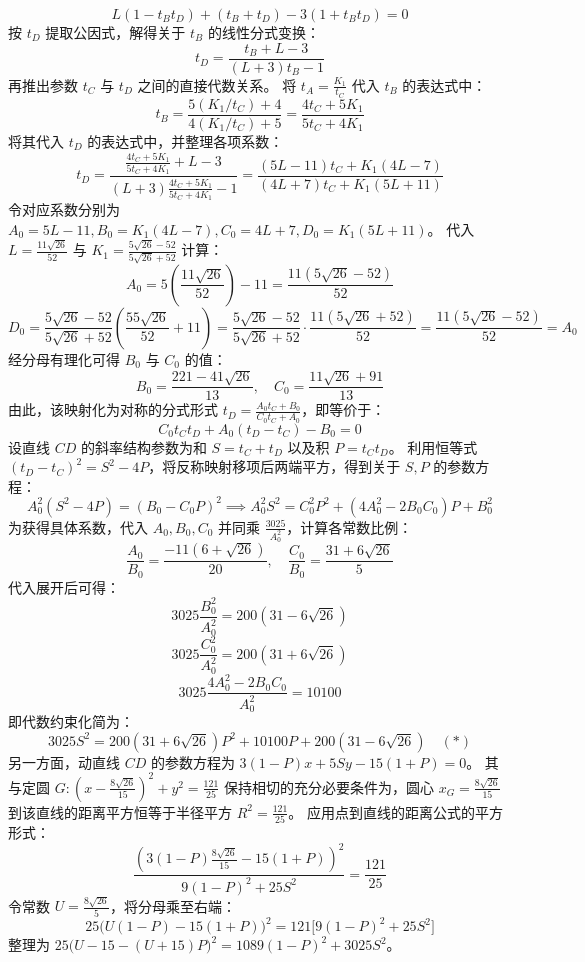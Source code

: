 \begin{solution}
$$ L(1 - t_B t_D) + (t_B + t_D) - 3(1 + t_B t_D) = 0 $$
按 $t_D$ 提取公因式，解得关于 $t_B$ 的线性分式变换：
$$ t_D = \frac{t_B + L - 3}{(L + 3)t_B - 1} $$
再推出参数 $t_C$ 与 $t_D$ 之间的直接代数关系。
将 $t_A = \frac{K_1}{t_C}$ 代入 $t_B$ 的表达式中：
$$ t_B = \frac{5(K_1/t_C) + 4}{4(K_1/t_C) + 5} = \frac{4t_C + 5K_1}{5t_C + 4K_1} $$
将其代入 $t_D$ 的表达式中，并整理各项系数：
$$ t_D = \frac{\frac{4t_C + 5K_1}{5t_C + 4K_1} + L - 3}{(L + 3)\frac{4t_C + 5K_1}{5t_C + 4K_1} - 1} = \frac{(5L - 11)t_C + K_1(4L - 7)}{(4L + 7)t_C + K_1(5L + 11)} $$
令对应系数分别为 $A_0 = 5L - 11, B_0 = K_1(4L - 7), C_0 = 4L + 7, D_0 = K_1(5L + 11)$。
代入 $L = \frac{11\sqrt{26}}{52}$ 与 $K_1 = \frac{5\sqrt{26} - 52}{5\sqrt{26} + 52}$ 计算：
$$ A_0 = 5\left(\frac{11\sqrt{26}}{52}\right) - 11 = \frac{11(5\sqrt{26} - 52)}{52} $$
$$ D_0 = \frac{5\sqrt{26} - 52}{5\sqrt{26} + 52} \left(\frac{55\sqrt{26}}{52} + 11\right) = \frac{5\sqrt{26} - 52}{5\sqrt{26} + 52} \cdot \frac{11(5\sqrt{26} + 52)}{52} = \frac{11(5\sqrt{26} - 52)}{52} = A_0 $$
经分母有理化可得 $B_0$ 与 $C_0$ 的值：
$$ B_0 = \frac{221 - 41\sqrt{26}}{13}, \quad C_0 = \frac{11\sqrt{26} + 91}{13} $$
由此，该映射化为对称的分式形式 $t_D = \frac{A_0 t_C + B_0}{C_0 t_C + A_0}$，即等价于：
$$ C_0 t_C t_D + A_0(t_D - t_C) - B_0 = 0 $$
设直线 $CD$ 的斜率结构参数为和 $S = t_C + t_D$ 以及积 $P = t_C t_D$。
利用恒等式 $(t_D - t_C)^2 = S^2 - 4P$，将反称映射移项后两端平方，得到关于 $S, P$ 的参数方程：
$$ A_0^2(S^2 - 4P) = (B_0 - C_0 P)^2 \implies A_0^2 S^2 = C_0^2 P^2 + (4A_0^2 - 2B_0 C_0) P + B_0^2 $$
为获得具体系数，代入 $A_0, B_0, C_0$ 并同乘 $\frac{3025}{A_0^2}$，计算各常数比例：
$$ \frac{A_0}{B_0} = \frac{-11(6 + \sqrt{26})}{20}, \quad \frac{C_0}{B_0} = \frac{31 + 6\sqrt{26}}{5} $$
代入展开后可得：
$$ 3025 \frac{B_0^2}{A_0^2} = 200(31 - 6\sqrt{26}) $$
$$ 3025 \frac{C_0^2}{A_0^2} = 200(31 + 6\sqrt{26}) $$
$$ 3025 \frac{4A_0^2 - 2B_0 C_0}{A_0^2} = 10100 $$
即代数约束化简为：
$$ 3025 S^2 = 200(31 + 6\sqrt{26}) P^2 + 10100 P + 200(31 - 6\sqrt{26}) \quad (*) $$
另一方面，动直线 $CD$ 的参数方程为 $3(1 - P)x + 5Sy - 15(1 + P) = 0$。
其与定圆 $G: \left(x - \frac{8\sqrt{26}}{15}\right)^2 + y^2 = \frac{121}{25}$ 保持相切的充分必要条件为，圆心 $x_G = \frac{8\sqrt{26}}{15}$ 到该直线的距离平方恒等于半径平方 $R^2 = \frac{121}{25}$。
应用点到直线的距离公式的平方形式：
$$ \frac{\left(3(1 - P)\frac{8\sqrt{26}}{15} - 15(1 + P)\right)^2}{9(1 - P)^2 + 25S^2} = \frac{121}{25} $$
令常数 $U = \frac{8\sqrt{26}}{5}$，将分母乘至右端：
$$ 25\big( U(1 - P) - 15(1 + P) \big)^2 = 121 \big[ 9(1 - P)^2 + 25S^2 \big] $$
整理为 $25\big( U - 15 - (U + 15)P \big)^2 = 1089(1 - P)^2 + 3025 S^2$。

\end{solution}
